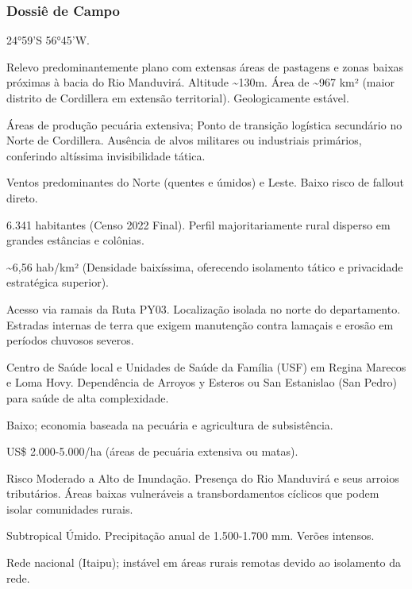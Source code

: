 \subsubsection{Dossiê de Campo}
\begin{description}[style=nextline,leftmargin=0.5cm,font=\bfseries]
\item[Coordenadas]  24°59'S 56°45'W.
\item[Topografia]  Relevo predominantemente plano com extensas áreas de pastagens e zonas baixas próximas à bacia do Rio Manduvirá. Altitude \textasciitilde 130m. Área de \textasciitilde 967 km² (maior distrito de Cordillera em extensão territorial). Geologicamente estável.
\item[Alvos Estratégicos]  Áreas de produção pecuária extensiva; Ponto de transição logística secundário no Norte de Cordillera. Ausência de alvos militares ou industriais primários, conferindo altíssima invisibilidade tática.
\item[Fallout]  Ventos predominantes do Norte (quentes e úmidos) e Leste. Baixo risco de fallout direto.
\item[População]  6.341 habitantes (Censo 2022 Final). Perfil majoritariamente rural disperso em grandes estâncias e colônias.
\item[Densidade]  \textasciitilde 6,56 hab/\allowbreak km² (Densidade baixíssima, oferecendo isolamento tático e privacidade estratégica superior).
\item[Vias de Acesso]  Acesso via ramais da Ruta PY03. Localização isolada no norte do departamento. Estradas internas de terra que exigem manutenção contra lamaçais e erosão em períodos chuvosos severos.
\item[Serviços]  Centro de Saúde local e Unidades de Saúde da Família (USF) em Regina Marecos e Loma Hovy. Dependência de Arroyos y Esteros ou San Estanislao (San Pedro) para saúde de alta complexidade.
\item[Custo de Vida]  Baixo; economia baseada na pecuária e agricultura de subsistência.
\item[Preço da Terra]  US\$ 2.000-5.000/\allowbreak ha (áreas de pecuária extensiva ou matas).
\item[Hidrologia]  Risco Moderado a Alto de Inundação. Presença do Rio Manduvirá e seus arroios tributários. Áreas baixas vulneráveis a transbordamentos cíclicos que podem isolar comunidades rurais.
\item[Clima]  Subtropical Úmido. Precipitação anual de 1.500-1.700 mm. Verões intensos.
\item[Energia]  Rede nacional (Itaipu); instável em áreas rurais remotas devido ao isolamento da rede.

\end{description}
